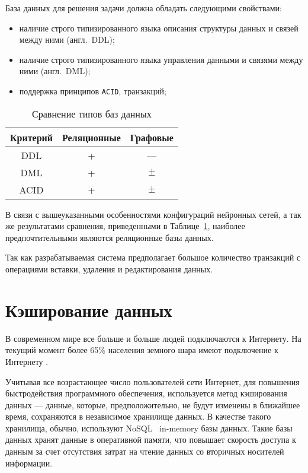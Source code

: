 База данных для решения задачи должна обладать следующими свойствами:
\begin{itemize}
    \item наличие строго типизированного языка описания структуры данных и связей между ними (англ.~DDL);
    \item наличие строго типизированного языка управления данными и связями между ними (англ.~DML);
    \item поддержка принципов \texttt{ACID}, транзакций;
\end{itemize}

\begin{table}[!ht]
    \caption{Сравнение типов баз данных}
    \label{tbl:comparison}
    \begin{center}
        \begin{tabular}{|c|c|c|}
            \hline
            \textbf{Критерий} & \textbf{Реляционные} & \textbf{Графовые} \\\hline
            DDL & + & --- \\\hline
            DML & + & $\pm$ \\\hline
            ACID & + & $\pm$ \\\hline
        \end{tabular}
    \end{center}
\end{table}

В связи с вышеуказанными особенностями конфигураций нейронных сетей, а так же результатами сравнения, приведенными в Таблице~\ref{tbl:comparison}, наиболее предпочтительными являются реляционные базы данных.

Так как разрабатываемая система предполагает большое количество транзакций с операциями вставки, удаления и редактирования данных.

\section{Кэширование данных}

В современном мире все больше и больше людей подключаются к Интернету. На текущий момент более 65\% населения земного шара имеют подключение к Интернету \cite{internetusers}.

Учитывая все возрастающее число пользователей сети Интернет, для повышения быстродействия программного обеспечения, используется метод кэширования данных --- данные, которые, предположительно, не будут изменены в ближайшее время, сохраняются в независимое хранилище данных. В качестве такого хранилища, обычно, используют NoSQL~\cite{nosql} in-memory базы данных. Такие базы данных хранят данные в оперативной памяти, что повышает скорость доступа к данным за счет отсутствия затрат на чтение данных со вторичных носителей информации.

